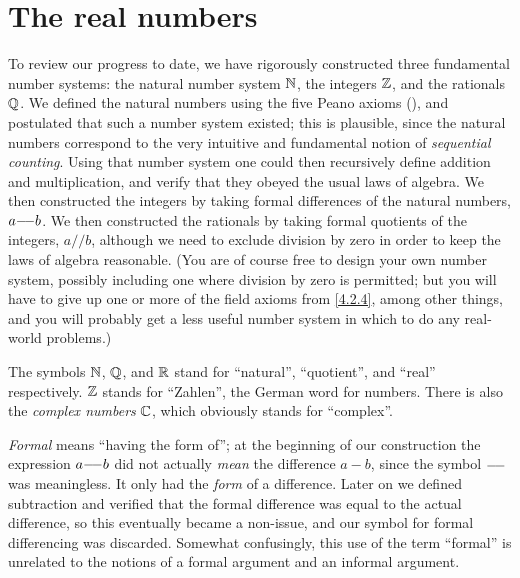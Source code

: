 \chapter{The real numbers}\label{ch:5}

\begin{note}
  To review our progress to date, we have rigorously constructed three fundamental number systems:
  the natural number system \(\mathbb{N}\), the integers \(\mathbb{Z}\), and the rationals \(\mathbb{Q}\).
  We defined the natural numbers using the five Peano axioms (), and postulated that such a number system existed;
  this is plausible, since the natural numbers correspond to the very intuitive and fundamental notion of \emph{sequential counting}.
  Using that number system one could then recursively define addition and multiplication, and verify that they obeyed the usual laws of algebra.
  We then constructed the integers by taking formal differences of the natural numbers, \(a {-}\!{-} b\).
  We then constructed the rationals by taking formal quotients of the integers, \(a // b\), although we need to exclude division by zero in order to keep the laws of algebra reasonable.
  (You are of course free to design your own number system, possibly including one where division by zero is permitted;
  but you will have to give up one or more of the field axioms from \cref{4.2.4}, among other things, and you will probably get a less useful number system in which to do any real-world problems.)
\end{note}

\begin{note}
  The symbols \(\mathbb{N}\), \(\mathbb{Q}\), and \(\mathbb{R}\) stand for ``natural'', ``quotient'', and ``real'' respectively.
  \(\mathbb{Z}\) stands for ``Zahlen'', the German word for numbers.
  There is also the \emph{complex numbers} \(\mathbb{C}\), which obviously stands for ``complex''.
\end{note}

\begin{note}
  \emph{Formal} means ``having the form of'';
  at the beginning of our construction the expression \(a {-}\!{-} b\) did not actually \emph{mean} the difference \(a - b\), since the symbol \({-}\!{-}\) was meaningless.
  It only had the \emph{form} of a difference.
  Later on we defined subtraction and verified that the formal difference was equal to the actual difference, so this eventually became a non-issue, and our symbol for formal differencing was discarded.
  Somewhat confusingly, this use of the term ``formal'' is unrelated to the notions of a formal argument and an informal argument.
\end{note}


